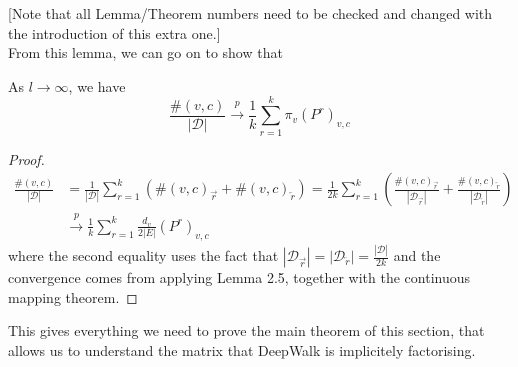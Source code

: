 \documentclass[a4paper]{article}
\newcommand{\D}{\mathcal D}
\newcommand{\rar}{\overrightarrow r}
\newcommand{\lar}{\overleftarrow r}
\begin{document}
[Note that all Lemma/Theorem numbers need to be checked and changed with the introduction of this extra one.]\\
From this lemma, we can go on to show that
\begin{lemma}
  As $l \to \infty$, we have
  \[\frac{\#(v, c)}{|\D|} \overset{p}{\longrightarrow} \frac{1}{k} \sum_{r = 1}^k \pi_v
    (P^r)_{v,c}\]
\end{lemma}
\begin{proof}
  \begin{align*}
    \frac{\#(v, c)}{|\D|} &=  \frac{1}{|\D|}\sum_{r=1}^k (\#(v, c)_{\rar} + \#(v, c)_{\lar})= \frac{1}{2k} \sum_{r=1}^k \left( \frac{\#(v, c)_{\rar}}{|\D_{\rar}|} + \frac{\#(v, c)_{\lar}}{|\D_{\lar}|} \right)\\
                          &\overset{p}{\longrightarrow} \frac{1}{k}\sum_{r=1}^{k} \frac{d_v}{2|E|}(P^r)_{v, c}
  \end{align*}
  where the second equality uses the fact that $|\D_{\rar}| = |\D_{\lar}| =
  \frac{|\D|}{2k}$ and the convergence comes from applying Lemma 2.5,
  together with the continuous mapping theorem.
\end{proof}
This gives everything we need to prove the main theorem of this section, that
allows us to understand the matrix that DeepWalk is implicitely factorising.
\MainDeepWalk*
\end{document}
